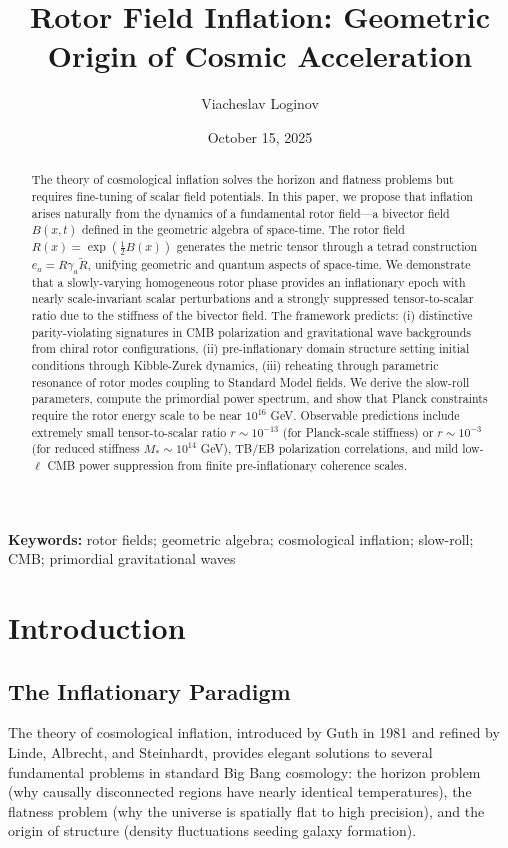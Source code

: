 \documentclass[11pt,a4paper]{article}
\title{Rotor Field Inflation: Geometric Origin of Cosmic Acceleration}
\author[1]{Viacheslav Loginov}
\affil[1]{Kyiv, Ukraine\\ \texttt{barthez.slavik@gmail.com}}
\date{October 15, 2025}
\numberwithin{equation}{section}
\theoremstyle{plain}
\theoremstyle{definition}
\theoremstyle{remark}
\newcommand{\keywords}{\textbf{Keywords:} rotor fields; geometric algebra; cosmological inflation; slow-roll; CMB; primordial gravitational waves}
\begin{document}
\maketitle

\begin{abstract}
The theory of cosmological inflation solves the horizon and flatness problems but requires fine-tuning of scalar field potentials. In this paper, we propose that inflation arises naturally from the dynamics of a fundamental rotor field---a bivector field $B(x,t)$ defined in the geometric algebra of space-time. The rotor field $R(x) = \exp(\frac{1}{2}B(x))$ generates the metric tensor through a tetrad construction $e_a = R\gamma_a\widetilde{R}$, unifying geometric and quantum aspects of space-time. We demonstrate that a slowly-varying homogeneous rotor phase provides an inflationary epoch with nearly scale-invariant scalar perturbations and a strongly suppressed tensor-to-scalar ratio due to the stiffness of the bivector field. The framework predicts: (i) distinctive parity-violating signatures in CMB polarization and gravitational wave backgrounds from chiral rotor configurations, (ii) pre-inflationary domain structure setting initial conditions through Kibble-Zurek dynamics, (iii) reheating through parametric resonance of rotor modes coupling to Standard Model fields. We derive the slow-roll parameters, compute the primordial power spectrum, and show that Planck constraints require the rotor energy scale to be near $10^{16}$ GeV. Observable predictions include extremely small tensor-to-scalar ratio $r \sim 10^{-13}$ (for Planck-scale stiffness) or $r \sim 10^{-3}$ (for reduced stiffness $M_* \sim 10^{14}$ GeV), TB/EB polarization correlations, and mild low-$\ell$ CMB power suppression from finite pre-inflationary coherence scales.
\end{abstract}

\keywords

\section{Introduction}
\label{sec:intro}

\subsection{The Inflationary Paradigm}

The theory of cosmological inflation, introduced by Guth in 1981 and refined by Linde, Albrecht, and Steinhardt, provides elegant solutions to several fundamental problems in standard Big Bang cosmology: the horizon problem (why causally disconnected regions have nearly identical temperatures), the flatness problem (why the universe is spatially flat to high precision), and the origin of structure (density fluctuations seeding galaxy formation).
\end{document}
